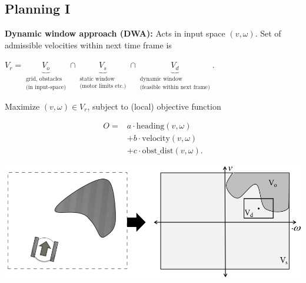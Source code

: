 \documentclass[landscape]{article}
\newcommand{\vmspace}{\vspace{-7pt}}
\begin{document}
\begin{multicols}{3}
\vfill


\section{Planning I}

\vmspace

\begin{minipage}{\columnwidth}
  \textbf{Dynamic window approach (DWA):} Acts in input space $(v,\omega)$. Set
  of admissible velocities within next time frame is
  \vmspace
  \begin{center}
    $
    V_r =
    \underbrace{V_o}_{\substack{\text{grid, obstacles} \\ \text{(in
    input-space)}}}
    \cap \underbrace{V_s}_{\substack{\text{static window} \\ \text{(motor
    limits etc.)}}}
    \cap \underbrace{V_d}_{\substack{\text{dynamic window} \\ \text{(feasible
    within next frame)}}}
    .
    $
  \end{center}
  \vmspace
  Maximize $(v,\omega)\in V_r$, subject to (local) objective function\\
  \vmspace
  \begin{minipage}{0.4\columnwidth}
    \vspace{-18pt}
    \begin{equation*}
      \begin{split}
        O =& a\cdot\mathrm{heading}(v,\omega)\\
        &+ b\cdot\mathrm{velocity}(v,\omega)\\
        &+ c\cdot \mathrm{obst\_dist}(v,\omega).
      \end{split}
    \end{equation*}
  \end{minipage}
  \begin{minipage}{0.59\columnwidth}
  \includegraphics[width=\columnwidth]{img/12_DynamicWindow.png}
  \end{minipage}
\end{minipage}


\end{multicols}
\end{document}
